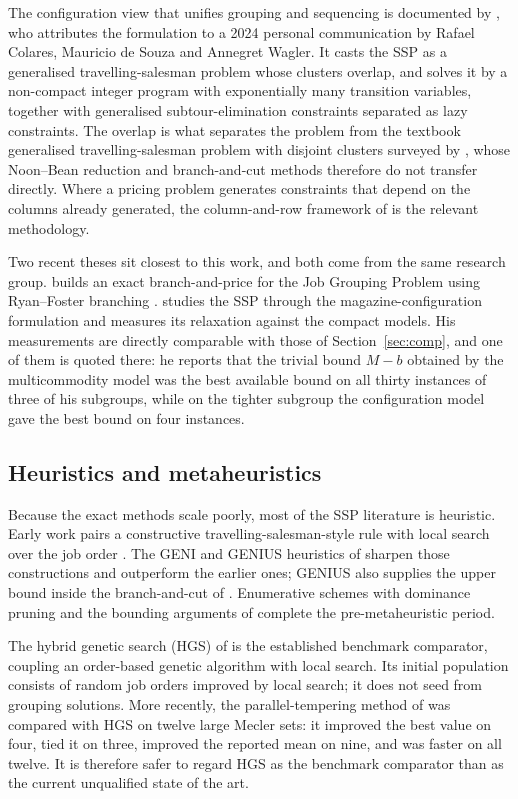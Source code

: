 The configuration view that unifies grouping and sequencing is documented by
\citet{Moreira2026}, who attributes the formulation to a 2024 personal communication
by Rafael Colares, Mauricio de Souza and Annegret Wagler. It casts the SSP as a
generalised travelling-salesman problem whose clusters overlap, and solves it by a
non-compact integer program with exponentially many transition variables, together
with generalised subtour-elimination constraints separated as lazy constraints. The
overlap is what separates the problem from the textbook generalised
travelling-salesman problem with disjoint clusters surveyed by \citet{Pop2024}, whose
Noon--Bean reduction \citep{Noon1993} and branch-and-cut methods
\citep{Fischetti1997} therefore do not transfer directly. Where a pricing problem
generates constraints that depend on the columns already generated, the
column-and-row framework of \citet{Muter2013} is the relevant methodology.

Two recent theses sit closest to this work, and both come from the same research
group. \citet{Otiai2026} builds an exact branch-and-price for the Job Grouping
Problem using Ryan--Foster branching \citep{Ryan1981}. \citet{Moreira2026} studies
the SSP through the magazine-configuration formulation and measures its relaxation
against the compact models. His measurements are directly comparable with those of
Section~\ref{sec:comp}, and one of them is quoted there: he reports that the trivial
bound $M-b$ obtained by the multicommodity model was the best available bound on all
thirty instances of three of his subgroups, while on the tighter subgroup the
configuration model gave the best bound on four instances.

\subsection{Heuristics and metaheuristics}\label{ssec:sota-heur}

Because the exact methods scale poorly, most of the SSP literature is heuristic.
Early work pairs a constructive travelling-salesman-style rule with local search over
the job order \citep{Crama1994}. The GENI and GENIUS heuristics of \citet{Hertz1998}
sharpen those constructions and outperform the earlier ones; GENIUS also supplies the
upper bound inside the branch-and-cut of \citet{Laporte2004}. Enumerative schemes with
dominance pruning \citep{Yanasse2009} and the bounding arguments of
\citet{Ghiani2010} complete the pre-metaheuristic period.

The hybrid genetic search (HGS) of \citet{Mecler2021} is the established benchmark
comparator, coupling an order-based genetic algorithm with local search. Its initial
population consists of random job orders improved by local search; it does not seed
from grouping solutions. More recently, the parallel-tempering method of
\citet{Almeida2025} was compared with HGS on twelve large Mecler sets: it improved the
best value on four, tied it on three, improved the reported mean on nine, and was faster
on all twelve. It is therefore safer to regard HGS as the benchmark comparator than as
the current unqualified state of the art.

